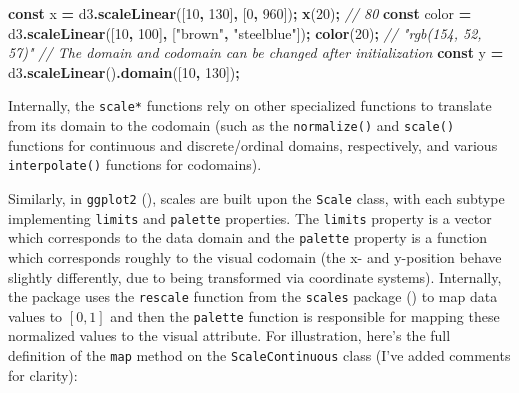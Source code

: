 \documentclass[
]{book}
\newenvironment{Shaded}{\begin{snugshade}}{\end{snugshade}}
\newcommand{\CommentTok}[1]{\textcolor[rgb]{0.56,0.35,0.01}{\textit{#1}}}
\newcommand{\DecValTok}[1]{\textcolor[rgb]{0.00,0.00,0.81}{#1}}
\newcommand{\FunctionTok}[1]{\textcolor[rgb]{0.13,0.29,0.53}{\textbf{#1}}}
\newcommand{\KeywordTok}[1]{\textcolor[rgb]{0.13,0.29,0.53}{\textbf{#1}}}
\newcommand{\NormalTok}[1]{#1}
\newcommand{\OperatorTok}[1]{\textcolor[rgb]{0.81,0.36,0.00}{\textbf{#1}}}
\newcommand{\StringTok}[1]{\textcolor[rgb]{0.31,0.60,0.02}{#1}}
\theoremstyle{definition}
\theoremstyle{definition}
\theoremstyle{definition}
\theoremstyle{definition}
\theoremstyle{remark}
\begin{document}
\begin{Shaded}
\begin{Highlighting}[]
\KeywordTok{const}\NormalTok{ x }\OperatorTok{=}\NormalTok{ d3}\OperatorTok{.}\FunctionTok{scaleLinear}\NormalTok{([}\DecValTok{10}\OperatorTok{,} \DecValTok{130}\NormalTok{]}\OperatorTok{,}\NormalTok{ [}\DecValTok{0}\OperatorTok{,} \DecValTok{960}\NormalTok{])}\OperatorTok{;}
\FunctionTok{x}\NormalTok{(}\DecValTok{20}\NormalTok{)}\OperatorTok{;} \CommentTok{// 80}
\KeywordTok{const}\NormalTok{ color }\OperatorTok{=}\NormalTok{ d3}\OperatorTok{.}\FunctionTok{scaleLinear}\NormalTok{([}\DecValTok{10}\OperatorTok{,} \DecValTok{100}\NormalTok{]}\OperatorTok{,}\NormalTok{ [}\StringTok{"brown"}\OperatorTok{,} \StringTok{"steelblue"}\NormalTok{])}\OperatorTok{;}
\FunctionTok{color}\NormalTok{(}\DecValTok{20}\NormalTok{)}\OperatorTok{;} \CommentTok{// "rgb(154, 52, 57)"}
\CommentTok{// The domain and codomain can be changed after initialization}
\KeywordTok{const}\NormalTok{ y }\OperatorTok{=}\NormalTok{ d3}\OperatorTok{.}\FunctionTok{scaleLinear}\NormalTok{()}\OperatorTok{.}\FunctionTok{domain}\NormalTok{([}\DecValTok{10}\OperatorTok{,} \DecValTok{130}\NormalTok{])}\OperatorTok{;} 
\end{Highlighting}
\end{Shaded}

Internally, the \texttt{scale*} functions rely on other specialized functions to translate from its domain to the codomain (such as the \texttt{normalize()} and \texttt{scale()} functions for continuous and discrete/ordinal domains, respectively, and various \texttt{interpolate()} functions for codomains).

Similarly, in \texttt{ggplot2} (), scales are built upon the \texttt{Scale} class, with each subtype implementing \texttt{limits} and \texttt{palette} properties. The \texttt{limits} property is a vector which corresponds to the data domain and the \texttt{palette} property is a function which corresponds roughly to the visual codomain (the x- and y-position behave slightly differently, due to being transformed via coordinate systems). Internally, the package uses the \texttt{rescale} function from the \texttt{scales} package () to map data values to \([0, 1]\) and then the \texttt{palette} function is responsible for mapping these normalized values to the visual attribute. For illustration, here's the full definition of the \texttt{map} method on the \texttt{ScaleContinuous} class (I've added comments for clarity):
\end{document}
